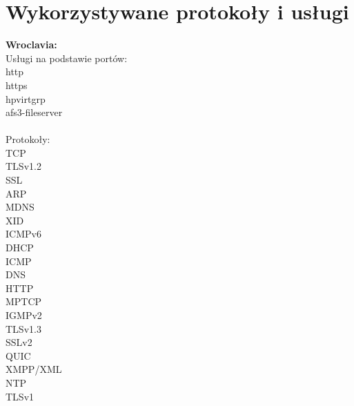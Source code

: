 \documentclass[12pt,a4paper]{article}
\begin{document}
    \section{Wykorzystywane protokoły i usługi}
        \begin{multicols}{2}
            \begin{center}
                \textbf{Wroclavia:}\\
                Usługi na podstawie portów:\\
                http\\
                https\\
                hpvirtgrp\\
                afs3-fileserver\\~\\

                Protokoły:\\
                TCP\\
                TLSv1.2\\
                SSL\\
                ARP\\
                MDNS\\
                XID\\
                ICMPv6\\
                DHCP\\
                ICMP\\
                DNS\\
                HTTP\\
                MPTCP\\
                IGMPv2\\
                TLSv1.3\\
                SSLv2\\
                QUIC\\
                XMPP/XML\\
                NTP\\
                TLSv1\\
                
                \vfill\null
                \columnbreak


\end{center}
\end{multicols}
\end{document}
